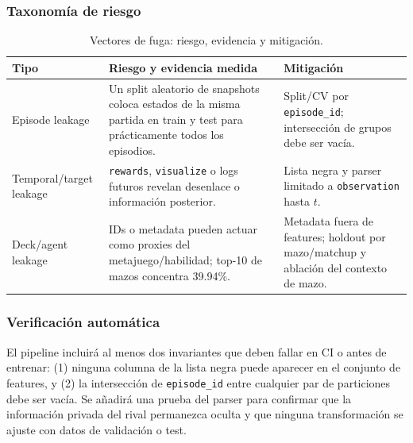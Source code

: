 \subsubsection{Taxonomía de riesgo}
\begin{table}[!t]
\centering
\caption{Vectores de fuga: riesgo, evidencia y mitigación.}
\label{tab:leakage}
\footnotesize
\begin{tabularx}{\columnwidth}{@{}P{1.9cm} Y P{2.2cm}@{}}
\toprule
\textbf{Tipo} & \textbf{Riesgo y evidencia medida} &
\textbf{Mitigación}\\
\midrule
Episode leakage & Un split aleatorio de snapshots coloca estados de la misma partida en train y test para prácticamente todos los episodios. & Split/CV por \texttt{episode\_id}; intersección de grupos debe ser vacía.\\
Temporal/target leakage & \texttt{rewards}, \texttt{visualize} o logs futuros revelan desenlace o información posterior. & Lista negra y parser limitado a \texttt{observation} hasta $t$.\\
Deck/agent leakage & IDs o metadata pueden actuar como proxies del metajuego/habilidad; top-10 de mazos concentra 39.94\%. & Metadata fuera de features; holdout por mazo/matchup y ablación del contexto de mazo.\\
\bottomrule
\end{tabularx}
\end{table}

\subsubsection{Verificación automática}
El pipeline incluirá al menos dos invariantes que deben fallar en CI o
antes de entrenar: (1) ninguna columna de la lista negra puede aparecer
en el conjunto de features, y (2) la intersección de
\texttt{episode\_id} entre cualquier par de particiones debe ser vacía.
Se añadirá una prueba del parser para confirmar que la información
privada del rival permanezca oculta y que ninguna transformación se
ajuste con datos de validación o test.
